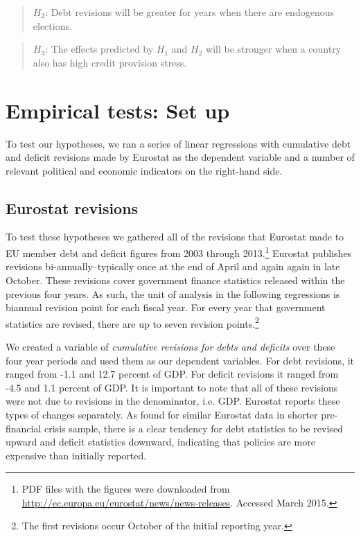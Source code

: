 \documentclass[]{article}
\begin{document}
\begin{quote}
    $H_{2}$: Debt revisions will be greater for years when there are endogenous elections.
\end{quote}

\begin{quote}
    $H_{3}$: The effects predicted by $H_{1}$ and $H_{2}$ will be stronger when a country also has high credit provision stress.
\end{quote}

\section{Empirical tests: Set up}

To test our hypotheses, we ran a series of linear regressions with cumulative debt and deficit revisions made by Eurostat as the dependent variable and a number of relevant political and economic indicators on the right-hand side.

\subsection{Eurostat revisions}

To test these hypotheses we gathered all of the revisions that Eurostat made to EU member debt and deficit figures from 2003 through 2013.\footnote{PDF files with the figures were downloaded from \url{http://ec.europa.eu/eurostat/news/news-releases}. Accessed March 2015.} Eurostat publishes revisions bi-annually--typically once at the end of April and again again in late October. These revisions cover government finance statistics released within the previous four years. As such, the unit of analysis in the following regressions is biannual revision point for each fiscal year. For every year that government statistics are revised, there are up to seven revision points.\footnote{The first revisions occur October of the initial reporting year.}

We created a variable of \emph{cumulative revisions for debts and deficits} over these four year periods and used them as our dependent variables. For debt revisions, it ranged from -1.1 and 12.7 percent of GDP. For deficit revisions it ranged from -4.5 and 1.1 percent of GDP. It is important to note that all of these revisions were not due to revisions in the denominator, i.e. GDP. Eurostat reports these types of changes separately. As \cite{DeCastro2013} found for similar Eurostat data in shorter pre-financial crisis sample, there is a clear tendency for debt statistics to be revised upward and deficit statistics downward, indicating that policies are more expensive than initially reported.
\end{document}
